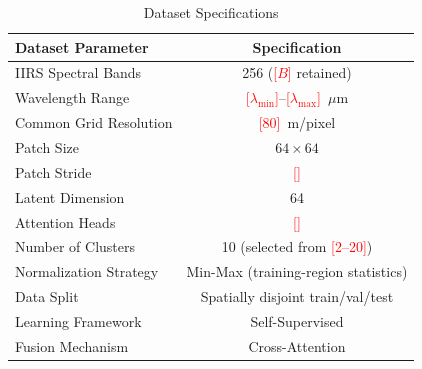 \documentclass[pdflatex,sn-mathphys-num]{sn-jnl}
\newcommand{\fillin}[1]{\textcolor{red}{[#1]}}
\begin{document}


\begin{table}[!t]
\centering
\caption{Dataset Specifications}
\label{tab:dataset_specs}
\renewcommand{\arraystretch}{1.1}
\begin{tabular}{lc}
\hline
\textbf{Dataset Parameter} & \textbf{Specification} \\
\hline
IIRS Spectral Bands & 256 (\fillin{$B$} retained) \\
Wavelength Range & \fillin{$\lambda_{\min}$}--\fillin{$\lambda_{\max}$}~$\mu$m \\
Common Grid Resolution & \fillin{80}~m/pixel \\
Patch Size & \(64 \times 64\) \\
Patch Stride & \fillin{} \\
Latent Dimension & 64 \\
Attention Heads & \fillin{} \\
Number of Clusters & 10 (selected from \fillin{2--20}) \\
Normalization Strategy & Min-Max (training-region statistics) \\
Data Split & Spatially disjoint train/val/test \\
Learning Framework & Self-Supervised \\
Fusion Mechanism & Cross-Attention \\
\hline
\end{tabular}
\end{table}


\end{document}
